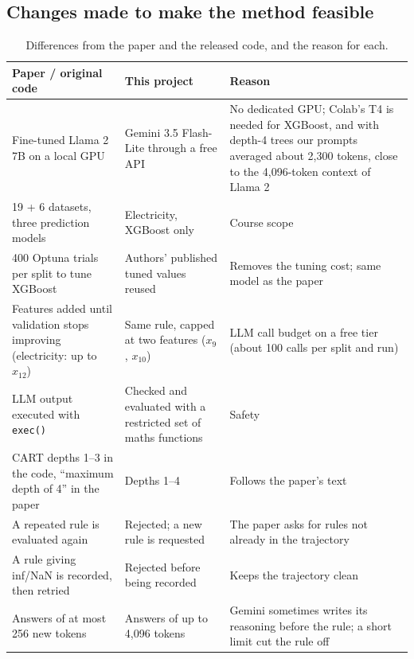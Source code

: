 \documentclass[11pt]{article}
\newcommand{\code}[1]{\texttt{#1}}
\begin{document}
\subsection{Changes made to make the method feasible}
\begin{table}[H]
\centering
\caption{Differences from the paper and the released code, and the reason for each.}
\label{tab:changes}
\begin{tabularx}{\linewidth}{@{}L{4.3cm}L{4.7cm}Y@{}}
\toprule
Paper / original code & This project & Reason \\
\midrule
Fine-tuned Llama 2 7B on a local GPU & Gemini 3.5 Flash-Lite through a free API & No dedicated GPU; Colab's T4 is needed for XGBoost, and with depth-4 trees our prompts averaged about 2,300 tokens, close to the 4,096-token context of Llama 2 \\
19 + 6 datasets, three prediction models & Electricity, XGBoost only & Course scope \\
400 Optuna trials per split to tune XGBoost & Authors' published tuned values reused & Removes the tuning cost; same model as the paper \\
Features added until validation stops improving (electricity: up to $x_{12}$) & Same rule, capped at two features ($x_9$, $x_{10}$) & LLM call budget on a free tier (about 100 calls per split and run) \\
LLM output executed with \code{exec()} & Checked and evaluated with a restricted set of maths functions & Safety \\
CART depths 1--3 in the code, ``maximum depth of 4'' in the paper & Depths 1--4 & Follows the paper's text \\
A repeated rule is evaluated again & Rejected; a new rule is requested & The paper asks for rules not already in the trajectory \\
A rule giving inf/NaN is recorded, then retried & Rejected before being recorded & Keeps the trajectory clean \\
Answers of at most 256 new tokens & Answers of up to 4,096 tokens & Gemini sometimes writes its reasoning before the rule; a short limit cut the rule off \\
\bottomrule
\end{tabularx}
\end{table}
\end{document}
